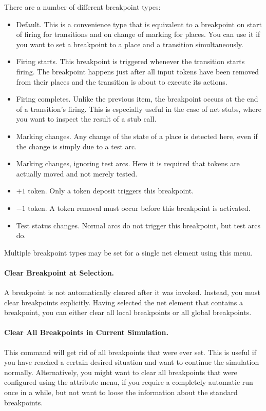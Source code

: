 There are a number of different breakpoint types:
\begin{itemize}
\item Default. This is a convenience type that is equivalent to
  a breakpoint on start of firing for transitions and on change
  of marking for places. You can use it if you want to set
  a breakpoint to a place and a transition simultaneously.
\item Firing starts. This breakpoint is triggered
  whenever the transition starts firing. The breakpoint happens just
  after all input tokens have been removed from their places and
  the transition is about to execute its actions.
\item Firing completes. Unlike the previous item, the breakpoint
  occurs at the end of a transition's firing. This is especially
  useful in the case of net stubs, where you want to inspect the
  result of a stub call.
\item Marking changes. Any change of the state of a place is detected here,
  even if the change is simply due to a test arc.
\item Marking changes, ignoring test arcs.
  Here it is required that tokens are actually moved and not merely
  tested.
\item $+1$ token. Only a token deposit triggers this breakpoint.
\item $-1$ token. A token removal must occur before this breakpoint
  is activated.
\item Test status changes. Normal arcs do not
  trigger this breakpoint, but test arcs do.
\end{itemize}
Multiple breakpoint types may be set for a single net element
using this menu.

\paragraph{Clear Breakpoint at Selection.}

A breakpoint is not automatically cleared after it was invoked.
Instead, you must clear breakpoints explicitly.
Having selected the net element that contains a
breakpoint, you can either clear all local breakpoints or
all global breakpoints.

\paragraph{Clear All Breakpoints in Current Simulation.}

This command  will get rid of all breakpoints that were ever set.
This is useful if you have reached a certain desired situation
and want to continue the simulation normally. Alternatively,
you might want to clear all breakpoints that were configured using
the attribute menu, if you require a completely automatic run
once in a while, but not want to loose the information about the standard
breakpoints.

